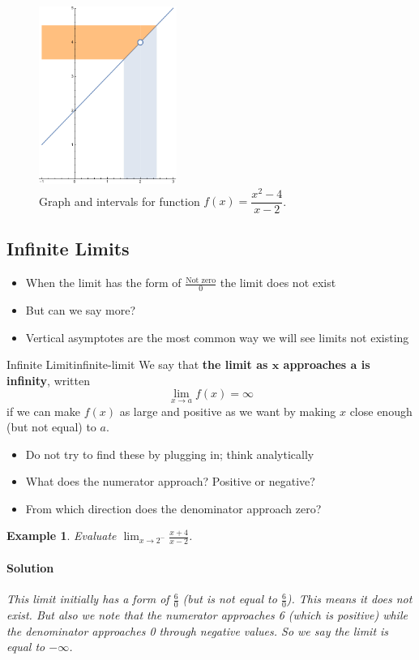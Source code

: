 \documentclass[letterpaper, 11pt, openany]{book}
\theoremstyle{mytheoremstyle}
\theoremstyle{myexamplestyle}
\newtheorem{example}{Example}[section]
\newenvironment{solution}{\paragraph{\sffamily \smaller \fontseries{b}\selectfont Solution}}{\hfill\faSquare}
\begin{document}
\begin{figure}[htbp]
    \centering
        \includegraphics[width=0.4\textwidth]{Figures/deflimitplot.pdf}
    \caption{Graph and intervals for function $f(x) = \dfrac{x^{2} - 4}{x - 2}$.}
    \label{f:deflimitplot}
\end{figure}

\subsection{Infinite Limits}
\setcounter{figure}{0}

\begin{itemize}
    \item When the limit has the form of $\frac{\text{Not zero}}{0}$ the limit does not exist
    \item But can we say more?
    \item Vertical asymptotes are the most common way we will see limits not existing
\end{itemize}
\begin{definition}{Infinite Limit}{infinite-limit}
    We say that \textbf{the limit as $\bm{x}$ approaches $\bm{a}$ is infinity}, written
    \[
        \lim_{x\to a} f(x) = \infty
    \]    
    if we can make $f(x)$ as large and positive as we want by making $x$ close enough (but not equal) to $a$.
\end{definition}
\begin{itemize}
    \item Do not try to find these by plugging in; think analytically
    \item What does the numerator approach? Positive or negative?
    \item From which direction does the denominator approach zero?
\end{itemize}

\begin{example}\label{e:inf-limit-one-side}
    Evaluate $\displaystyle \lim_{x \to 2^{-}} \frac{x+4}{x-2}$.
    \begin{solution}
        This limit initially has a form of $\frac{6}{0}$ (\emph{but is not equal to} $\frac{6}{0}$). This means it does not exist. But also we note that the numerator approaches 6 (which is positive) while the denominator approaches 0 through negative values. So we say the limit is equal to $-\infty$.
    \end{solution}
\end{example}
\end{document}
